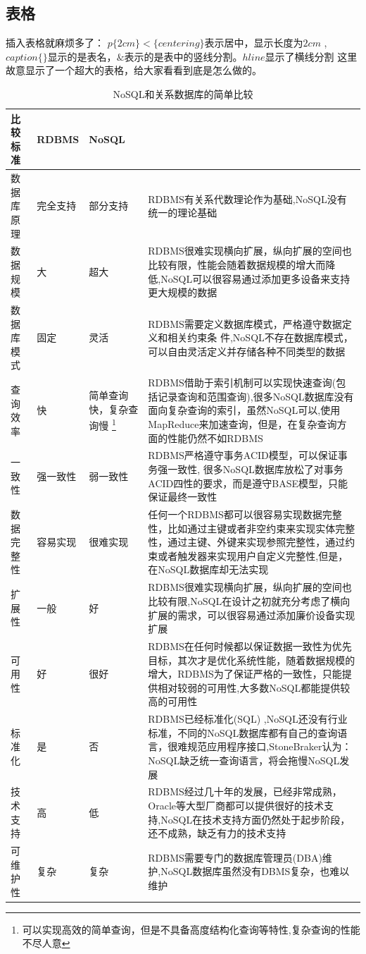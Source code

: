 \documentclass[../docment.tex]{subfiles}
\begin{document}
	\subsection{表格}
	插入表格就麻烦多了：
	$ p\{2cm\}<\{ centering \} $表示居中，显示长度为$ 2cm$ , $ caption \{ \}$显示的是表名，$\&$表示的是表中的竖线分割。$hline$显示了横线分割
	这里故意显示了一个超大的表格，给大家看看到底是怎么做的。
	\begin{longtable}{p{2cm}<{\centering} |p{2cm}<{\centering} |p{2.5cm} <{\centering} |p{8cm} }
		\caption{\label{tab:表格}NoSQL和关系数据库的简单比较}  \\
		\hline 
		\hline 
		\textbf{比较标准} 	& \textbf{RDBMS} & \textbf{NoSQL} & \makecell[c]{\textbf{备注}}\\
		\hline
		数据库原理 &完全支持  & 部分支持 & 	RDBMS有关系代数理论作为基础,NoSQL没有统一的理论基础 \\
		\hline
		数据规模 &大  & 超大 & RDBMS很难实现横向扩展，纵向扩展的空间也比较有限，性能会随着数据规模的增大而降低,NoSQL可以很容易通过添加更多设备来支持更大规模的数据 \\
		\hline
		数据库模式 & 固定  & 灵活 & 	RDBMS需要定义数据库模式，严格遵守数据定义和相关约束条	件,NoSQL不存在数据库模式，可以自由灵活定义并存储各种不同类型的数据 \\
		\hline
		查询效率 & 快  & 简单查询快，复杂查询慢 \footnote{可以实现高效的简单查询，但是不具备高度结构化查询等特性,复杂查询的性能不尽人意} & RDBMS借助于索引机制可以实现快速查询(包括记录查询和范围查询),很多NoSQL数据库没有面向复杂查询的索引，虽然NoSQL可以,使用MapReduce来加速查询，但是，在复杂查询方面的性能仍然不如RDBMS \\
		\hline
		一致性 & 强一致性  & 弱一致性 & RDBMS严格遵守事务ACID模型，可以保证事务强一致性,	很多NoSQL数据库放松了对事务ACID四性的要求，而是遵守BASE模型，只能保证最终一致性
		\\
		\hline
		数据完整性 &容易实现  & 很难实现 & 	任何一个RDBMS都可以很容易实现数据完整性，比如通过主键或者非空约束来实现实体完整性，通过主键、外键来实现参照完整性，通过约束或者触发器来实现用户自定义完整性,但是，在NoSQL数据库却无法实现 \\
		\hline
		扩展性 & 一般  & 好 & RDBMS很难实现横向扩展，纵向扩展的空间也比较有限,NoSQL在设计之初就充分考虑了横向扩展的需求，可以很容易通过添加廉价设备实现扩展 \\
		\hline
		可用性 & 好  & 很好 & RDBMS在任何时候都以保证数据一致性为优先目标，其次才是优化系统性能，随着数据规模的增大，RDBMS为了保证严格的一致性，只能提供相对较弱的可用性,大多数NoSQL都能提供较高的可用性 \\
		\hline
		标准化 & 是  & 否 & 	RDBMS已经标准化(SQL)	,NoSQL还没有行业标准，不同的NoSQL数据库都有自己的查询语言，很难规范应用程序接口,StoneBraker认为：NoSQL缺乏统一查询语言，将会拖慢NoSQL发展 \\
		\hline
		技术支持 & 高  & 低 & RDBMS经过几十年的发展，已经非常成熟，Oracle等大型厂商都可以提供很好的技术支持,NoSQL在技术支持方面仍然处于起步阶段，还不成熟，缺乏有力的技术支持
		\\
		\hline
		可维护性 &复杂  & 复杂 & 	RDBMS需要专门的数据库管理员(DBA)维护,NoSQL数据库虽然没有DBMS复杂，也难以维护 \\
		\hline
		\hline
	\end{longtable}
\end{document}
